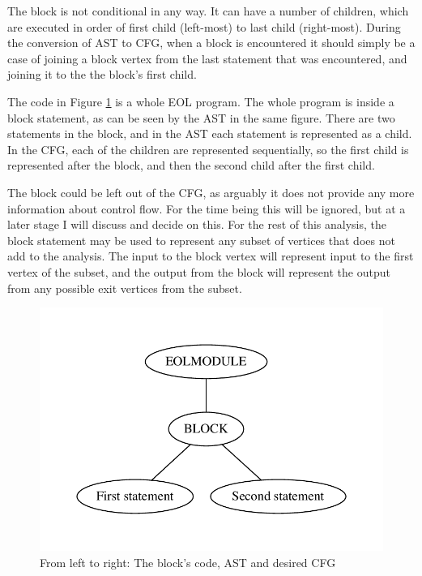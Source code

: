 The block is not conditional in any way. It can have a number of children, which are executed in order of first child (left-most) to last child (right-most). During the conversion of AST to CFG, when a block is encountered it should simply be a case of joining a block vertex from the last statement that was encountered, and joining it to the the block's first child.

The code in Figure \ref{fig:block} is a whole EOL program. The whole program is inside a block statement, as can be seen by the AST in the same figure. There are two statements in the block, and in the AST each statement is represented as a child. In the CFG, each of the children are represented sequentially, so the first child is represented after the block, and then the second child after the first child.

The block could be left out of the CFG, as arguably it does not provide any more information about control flow. For the time being this will be ignored, but at a later stage I will discuss and decide on this. For the rest of this analysis, the block statement may be used to represent any subset of vertices that does not add to the analysis. The input to the block vertex will represent input to the first vertex of the subset, and the output from the block will represent the output from any possible exit vertices from the subset.

\begin{figure}
\centering
\begin{minipage}{.3\textwidth}
  \centering
  
\end{minipage}%
\begin{minipage}{.3\textwidth}
  \centering
  \includegraphics[width=\linewidth]{figures/statements/block_AST.pdf}
\end{minipage}
\begin{minipage}{.3\textwidth}
  \centering
\end{minipage}
\caption{From left to right: The block's code, AST and desired CFG}
\label{fig:block}
\end{figure}

